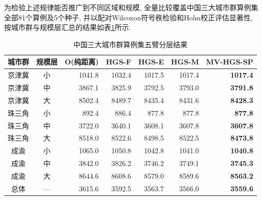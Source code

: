 \documentclass{setp-new}
\newcommand{\setptabsetup}{\fontsize{9pt}{10.5pt}\selectfont\renewcommand{\arraystretch}{0.95}\setlength{\tabcolsep}{2.2pt}\setlength{\aboverulesep}{0.4pt}\setlength{\belowrulesep}{0.4pt}\hbadness=10000}
\begin{document}
为检验上述规律能否推广到不同区域和规模,
全量比较覆盖中国三大城市群算例集全部81个算例及5个种子,
并以配对Wilcoxon符号秩检验和Holm校正评估显著性,
按城市群与规模层汇总的结果如表\ref{tab:china81-summary}所示.

\begin{table}[H]
\centering
\caption{中国三大城市群算例集五臂分层结果}
\label{tab:china81-summary}
\setptabsetup
\begin{tabular*}{\linewidth}{@{\extracolsep{\fill}}ccrrrrr@{}}
\toprule
城市群 & 规模层 & O(纯距离) & HGS-F & HGS-E & HGS-M & MV-HGS-SP\\
\midrule
京津冀 & 小 & 1041.8 & 1032.4 & 1017.5 & 1017.4 & \textbf{1017.4} \\
京津冀 & 中 & 3867.1 & 3825.9 & 3792.5 & 3793.0 & \textbf{3791.8} \\
京津冀 & 大 & 8502.4 & 8489.7 & 8435.4 & 8431.6 & \textbf{8428.3} \\
珠三角 & 小 & 892.4 & 886.4 & 877.8 & 877.8 & \textbf{877.8} \\
珠三角 & 中 & 3722.0 & 3640.1 & 3608.1 & 3607.8 & \textbf{3607.8} \\
珠三角 & 大 & 8518.0 & 8522.6 & 8498.5 & 8522.5 & \textbf{8473.8} \\
成渝 & 小 & 1065.0 & 1050.8 & 1042.8 & 1041.0 & \textbf{1040.8} \\
成渝 & 中 & 3842.0 & 3826.2 & 3746.2 & 3749.1 & \textbf{3745.3} \\
成渝 & 大 & 8644.6 & 8608.6 & 8579.0 & 8589.6 & \textbf{8563.2} \\
\midrule
总体 & --- & 3615.6 & 3592.5 & 3563.7 & 3566.0 & \textbf{3559.6} \\
\bottomrule
\end{tabular*}
\end{table}
\end{document}
